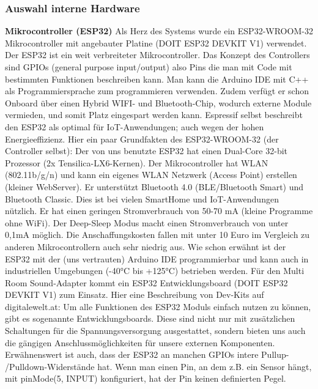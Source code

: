 \documentclass[11pt, twoside]{article}
\begin{document}
\subsubsection{Auswahl interne Hardware}
\textbf{Mikrocontroller (ESP32)}\newline
Als Herz des Systems wurde ein ESP32-WROOM-32 Mikrocontroller mit angebauter Platine (DOIT ESP32 DEVKIT V1) verwendet. Der ESP32 ist ein weit verbreiteter Mikrocontroller. Das Konzept des Controllers sind GPIOs (general purpose input/output) also Pins die man mit Code mit bestimmten Funktionen beschreiben kann. Man kann die Arduino IDE mit C++ als Programmiersprache zum programmieren verwenden. Zudem verfügt er schon Onboard über einen Hybrid WIFI- und Bluetooth-Chip, wodurch externe Module vermieden, und somit Platz eingespart werden kann. Espressif selbst beschreibt den ESP32 als optimal für IoT-Anwendungen; auch wegen der hohen Energieeffizienz.\newline
Hier ein paar Grundfakten des ESP32-WROOM-32 (der Controller selbst):\newline
Der von uns benutzte ESP32 hat einen Dual-Core 32-bit Prozessor (2x Tensilica-LX6-Kernen). Der Mikrocontroller hat WLAN (802.11b/g/n) und kann ein eigenes WLAN Netzwerk (Access Point) erstellen (kleiner WebServer). Er unterstützt Bluetooth 4.0 (BLE/Bluetooth Smart) und Bluetooth Classic. Dies ist bei vielen SmartHome und IoT-Anwendungen nützlich. Er hat einen geringen Stromverbrauch von 50-70 mA (kleine Programme ohne WiFi). Der Deep-Sleep Modus macht einen Stromverbrauch von unter 0,1mA möglich. Die Anschaffungskosten fallen mit unter 10 Euro im Vergleich zu anderen Mikrocontrollern auch sehr niedrig aus.\newline
Wie schon erwähnt ist der ESP32 mit der (uns vertrauten) Arduino IDE programmierbar und kann auch in industriellen Umgebungen (-40°C bis +125°C) betrieben werden.\newline
Für den Multi Room Sound-Adapter kommt ein ESP32 Entwicklungsboard (DOIT ESP32 DEVKIT V1) zum Einsatz.\newline
Hier eine Beschreibung von Dev-Kits auf digitalewelt.at: \glqq Um alle Funktionen des ESP32 Moduls einfach nutzen zu können, gibt es sogenannte Entwicklungsboards. Diese sind nicht nur mit zusätzlichen Schaltungen für die Spannungsversorgung ausgestattet, sondern bieten uns auch die gängigen Anschlussmöglichkeiten für unsere externen Komponenten.\grqq{} \newline
Erwähnenswert ist auch, dass der ESP32 an manchen GPIOs intere Pullup- /Pulldown-Widerstände hat. \glqq Wenn man einen Pin, an dem z.B. ein Sensor hängt, mit pinMode(5, INPUT) konfiguriert, hat der Pin keinen definierten Pegel.
\end{document}
